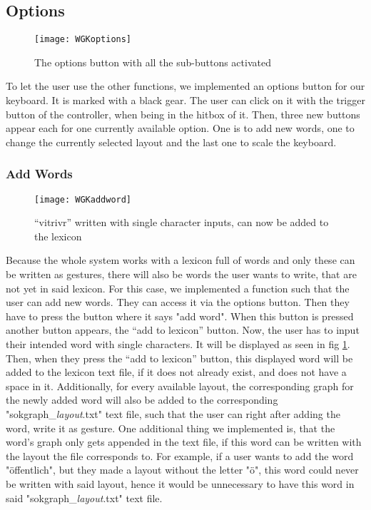\subsection{Options}

\begin{figure}
\centering
\texttt{[image: WGKoptions]}
\caption{The options button with all the sub-buttons activated}
\end{figure}

To let the user use the other functions, we implemented an options button for our keyboard. It is marked with a black gear. The user can click on it with the trigger button of the controller, when being in the hitbox of it. Then, three new buttons appear each for one currently available option. One is to add new words, one to change the currently selected layout and the last one to scale the keyboard.

\subsubsection{Add Words}
\begin{figure}
    \centering
    \texttt{[image: WGKaddword]}
    \caption{``vitrivr'' written with single character inputs, can now be added to the lexicon}
    \label{fig:addword}
\end{figure}
Because the whole system works with a lexicon full of words and only these can be written as gestures, there will also be words the user wants to write, that are not yet in said lexicon. For this case, we implemented a function such that the user can add new words. They can access it via the options button. Then they have to press the button where it says "add word". When this button is pressed another button appears, the ``add to lexicon'' button. Now, the user has to input their intended word with single characters. It will be displayed as seen in fig \ref{fig:addword}. Then, when they press the ``add to lexicon'' button, this displayed word will be added to the lexicon text file, if it does not already exist, and does not have a space in it. Additionally, for every available layout, the corresponding graph for the newly added word will also be added to the corresponding "sokgraph\_\textit{layout}.txt" text file, such that the user can right after adding the word, write it as gesture. One additional thing we implemented is, that the word's graph only gets appended in the text file, if this word can be written with the layout the file corresponds to. For example, if a user wants to add the word "öffentlich", but they made a layout without the letter "ö", this word could never be written with said layout, hence it would be unnecessary to have this word in said "sokgraph\_\textit{layout}.txt" text file.

